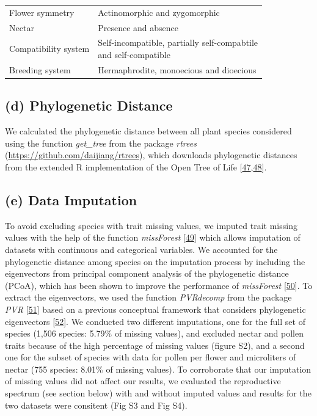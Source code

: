\documentclass[
  12pt,
  a4paper,
]{article}
\begin{document}
\begin{table}
\begin{tabular}[t]{ll}
\hspace{1em}Flower symmetry & Actinomorphic and zygomorphic\\
\hspace{1em}Nectar & Presence and absence\\
\hspace{1em}Compatibility system & \makecell[l]{Self-incompatible, partially self-compabtile \\ and self-compatible}\\
\hspace{1em}Breeding system & Hermaphrodite, monoecious and dioecious\\
\bottomrule
\end{tabular}
\end{table}

\doublespacing

\hypertarget{d-phylogenetic-distance}{%
\subsection{(d) Phylogenetic Distance}\label{d-phylogenetic-distance}}

We calculated the phylogenetic distance between all plant species considered using the function \emph{get\_tree} from the package \emph{rtrees} (\url{https://github.com/daijiang/rtrees}), which downloads phylogenetic distances from the extended R implementation of the Open Tree of Life {[}\protect\hyperlink{ref-smith2018}{47},\protect\hyperlink{ref-jin2019}{48}{]}.

\hypertarget{e-data-imputation}{%
\subsection{(e) Data Imputation}\label{e-data-imputation}}

To avoid excluding species with trait missing values, we imputed trait missing values with the help of the function \emph{missForest} {[}\protect\hyperlink{ref-stekhoven2012}{49}{]} which allows imputation of datasets with continuous and categorical variables. We accounted for the phylogenetic distance among species on the imputation process by including the eigenvectors from principal component analysis of the phylogenetic distance (PCoA), which has been shown to improve the performance of \emph{missForest} {[}\protect\hyperlink{ref-penone2014}{50}{]}. To extract the eigenvectors, we used the function \emph{PVRdecomp} from the package \emph{PVR} {[}\protect\hyperlink{ref-santos2018}{51}{]} based on a previous conceptual framework that considers phylogenetic eigenvectors {[}\protect\hyperlink{ref-diniz-filho2012}{52}{]}. We conducted two different imputations, one for the full set of species (1,506 species: 5.79\% of missing values), and excluded nectar and pollen traits because of the high percentage of missing values (figure S2), and a second one for the subset of species with data for pollen per flower and microliters of nectar (755 species: 8.01\% of missing values). To corroborate that our imputation of missing values did not affect our results, we evaluated the reproductive spectrum (see section below) with and without imputed values and results for the two datasets were consitent (Fig S3 and Fig S4).
\end{document}
